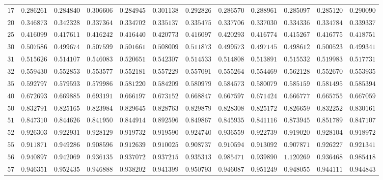 \begin{sidewaystable}
\begin{tabular}{r|rrrrrrrrrrr}
$17$ & $0.286261$ & $0.284840$ & $0.306606$ & $0.284945$ & $0.301138$ & $0.292826$ & $0.286570$ & $0.288961$ & $0.285097$ & $0.285120$ & $0.290090$ \\
$20$ & $0.346873$ & $0.342328$ & $0.337364$ & $0.334702$ & $0.335137$ & $0.335475$ & $0.337706$ & $0.337030$ & $0.334336$ & $0.334784$ & $0.339337$ \\
$25$ & $0.416099$ & $0.417611$ & $0.416242$ & $0.416440$ & $0.420773$ & $0.416097$ & $0.420293$ & $0.416774$ & $0.415267$ & $0.416775$ & $0.418751$ \\
$30$ & $0.507586$ & $0.499674$ & $0.507599$ & $0.501661$ & $0.508009$ & $0.511873$ & $0.499573$ & $0.497145$ & $0.498612$ & $0.500523$ & $0.499341$ \\
$31$ & $0.515626$ & $0.514107$ & $0.546083$ & $0.520651$ & $0.542307$ & $0.514533$ & $0.514808$ & $0.513891$ & $0.515532$ & $0.519983$ & $0.517731$ \\
$32$ & $0.559430$ & $0.552853$ & $0.553577$ & $0.552181$ & $0.557229$ & $0.557091$ & $0.555264$ & $0.554469$ & $0.562128$ & $0.552670$ & $0.553935$ \\
$35$ & $0.592797$ & $0.579593$ & $0.579986$ & $0.581220$ & $0.584209$ & $0.580979$ & $0.584573$ & $0.580079$ & $0.585159$ & $0.581495$ & $0.585394$ \\
$40$ & $0.672693$ & $0.669885$ & $0.693191$ & $0.666197$ & $0.673152$ & $0.668847$ & $0.667597$ & $0.671424$ & $0.666777$ & $0.665755$ & $0.667059$ \\
$50$ & $0.832791$ & $0.825165$ & $0.823984$ & $0.829645$ & $0.828763$ & $0.829879$ & $0.828308$ & $0.825172$ & $0.826659$ & $0.832252$ & $0.830161$ \\
$51$ & $0.847310$ & $0.844626$ & $0.841950$ & $0.844914$ & $0.892596$ & $0.849867$ & $0.845935$ & $0.841116$ & $0.873945$ & $0.851789$ & $0.847107$ \\
$52$ & $0.926303$ & $0.922931$ & $0.928129$ & $0.919732$ & $0.919590$ & $0.924740$ & $0.936559$ & $0.922739$ & $0.919020$ & $0.928104$ & $0.918972$ \\
$55$ & $0.911871$ & $0.949286$ & $0.908596$ & $0.912639$ & $0.910025$ & $0.908737$ & $0.910594$ & $0.913092$ & $0.907871$ & $0.926227$ & $0.921341$ \\
$56$ & $0.940897$ & $0.942069$ & $0.936135$ & $0.937072$ & $0.937215$ & $0.935313$ & $0.985471$ & $0.939890$ & $1.120269$ & $0.936468$ & $0.985418$ \\
$57$ & $0.946351$ & $0.952435$ & $0.946888$ & $0.938202$ & $0.941399$ & $0.950793$ & $0.946087$ & $0.951249$ & $0.948055$ & $0.944111$ & $0.944843$ \\

\end{tabular}
\end{sidewaystable}
